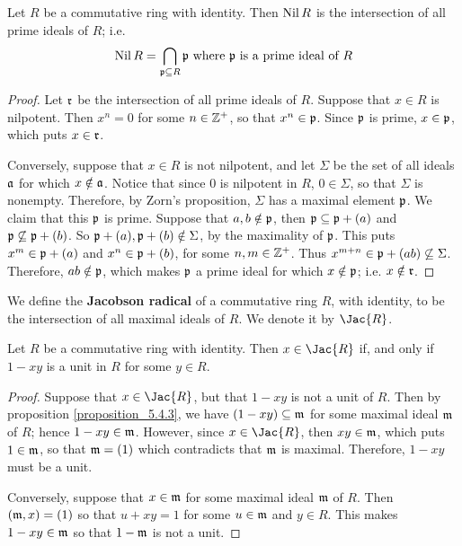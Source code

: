 \begin{proposition}\label{proposition_5.1.3}
    Let $R$ be a commutative ring with identity. Then $\operatorname{Nil}{R}$ is the
    intersection of all prime ideals of $R$; i.e.
    \begin{equation*}
        \operatorname{Nil}{R}=\bigcap_{\mathfrak{p} \subseteq R}{\mathfrak{p}} \text{ where } \mathfrak{p} \text{ is a
        prime ideal of } R
    \end{equation*}
\end{proposition}
\begin{proof}
    Let $\mathfrak{r}$ be the intersection of all prime ideals of $R$. Suppose that  $x
    \in R$ is nilpotent. Then $x^n=0$ for some $n \in \mathbb{Z}^+$, so that  $x^n \in
    \mathfrak{p}$. Since $\mathfrak{p}$ is prime, $x \in \mathfrak{p}$, which puts $x \in \mathfrak{r}$.

    Conversely, suppose that  $x \in R$ is not nilpotent, and let $\Sigma$ be
    the set of all ideals $\mathfrak{a}$ for which $x \notin \mathfrak{a}$. Notice that since $0$
    is nilpotent in $R$, $0 \in \Sigma$, so that $\Sigma$ is nonempty.
    Therefore, by Zorn's proposition, $\Sigma$ has a maximal element $\mathfrak{p}$. We claim
    that this $\mathfrak{p}$ is prime. Suppose that  $a,b \notin \mathfrak{p}$, then  $\mathfrak{p}
    \subseteq \mathfrak{p}+(a)$ and $\mathfrak{p} \not\subseteq \mathfrak{p}+(b)$. So $\mathfrak{p}+(a), \mathfrak{p}+(b)
    \notin \Sigma$, by the maximality of $\mathfrak{p}$. This puts  $x^m \in \mathfrak{p}+(a)$ and
    $x^n \in \mathfrak{p}+(b)$, for some $n,m \in \mathbb{Z}^+$. Thus  $x^{m+n} \in \mathfrak{p}+(ab)
    \not\subseteq \Sigma$. Therefore, $ab \notin \mathfrak{p}$, which makes $\mathfrak{p}$ a prime
    ideal for which $x \notin \mathfrak{p}$; i.e. $x \notin \mathfrak{r}$.
\end{proof}

\begin{definition}
    We define the \textbf{Jacobson radical} of a commutative ring $R$, with
    identity, to be the intersection of all maximal ideals of $R$. We denote it
    by  $\Jac{R}$.
\end{definition}

\begin{proposition}\label{proposition_5.5.4}
    Let $R$ be a commutative ring with identity. Then  $x \in \Jac{R}$ if, and
    only if $1-xy$ is a unit in $R$ for some $y \in R$.
\end{proposition}
\begin{proof}
    Suppose that $x \in \Jac{R}$, but that $1-xy$ is not a unit of $R$. Then by
    proposition \ref{proposition_5.4.3}, we have $(1-xy) \subseteq \mathfrak{m}$ for some maximal ideal
    $\mathfrak{m}$ of $R$; hence $1-xy \in \mathfrak{m}$. However, since $x \in \Jac{R}$, then $xy
    \in \mathfrak{m}$, which puts $1 \in \mathfrak{m}$, so that $\mathfrak{m}=(1)$ which contradicts that
    $\mathfrak{m}$ is maximal. Therefore,  $1-xy$ must be a unit.

    Conversely, suppose that  $x \in \mathfrak{m}$ for some maximal ideal $\mathfrak{m}$ of $R$.
    Then  $(\mathfrak{m},x)=(1)$ so that $u+xy=1$ for some  $u \in \mathfrak{m}$ and  $y \in R$.
    This makes  $1-xy \in \mathfrak{m}$ so that $1-\mathfrak{m}$ is not a unit.
\end{proof}

